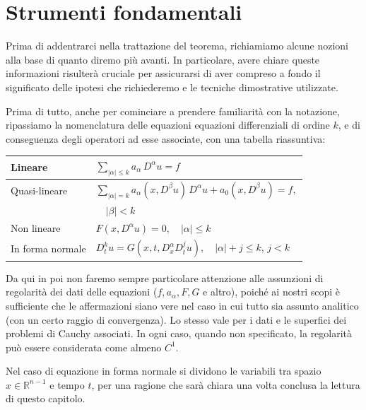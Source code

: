 \chapter{Strumenti fondamentali} \label{tools}
Prima di addentrarci nella trattazione del teorema, richiamiamo alcune nozioni alla base di quanto diremo più avanti. 
In particolare, avere chiare queste informazioni risulterà cruciale per assicurarsi di aver compreso a fondo il significato delle ipotesi che richiederemo e le tecniche dimostrative utilizzate.

Prima di tutto, anche per cominciare a prendere familiarità con la notazione, ripassiamo la nomenclatura delle equazioni equazioni differenziali di ordine $k$, e di conseguenza degli operatori ad esse associate, con una tabella riassuntiva:
\vspace{5mm}
\begin{center}
\renewcommand{\arraystretch}{2}
\begin{tabular}{l l} 
\hline \hline
 Lineare & $\sum_{|\alpha |\leq k} a_\alpha \, D^\alpha u = f$ \\
 \hline
 \vspace{-2mm}
 Quasi-lineare & $\sum_{|\alpha |= k} a_\alpha (x,D^\beta u) \, D^\alpha u +  a_0(x,D^\beta u)= f,$\\
 & $\quad |\beta |<k $ \\
 \hline
 Non lineare & $F(x,D^\alpha u)=0, \quad |\alpha | \leq k$ \\
 \hline
 In forma normale & $D_{t}^k u = G(x,t, D^\alpha_x D^j_t u), \quad |\alpha |+j \leq k, \, j < k$ \\
 \hline \hline
\end{tabular}
\end{center}
\vspace{5mm}
\begin{remark}
Da qui in poi non faremo sempre particolare attenzione alle assunzioni di regolarità dei dati delle equazioni ($f,a_\alpha,F,G$ e altro), poiché ai nostri scopi è sufficiente che le affermazioni siano vere nel caso in cui tutto sia assunto analitico (con un certo raggio di convergenza). Lo stesso vale per i dati e le superfici dei problemi di Cauchy associati. In ogni caso, quando non specificato, la regolarità può essere considerata come almeno $C^1$.
\end{remark}
\begin{remark}
Nel caso di equazione in forma normale si dividono le variabili tra spazio $x\in \mathbb{R}^{n-1}$ e tempo $t$, per una ragione che sarà chiara una volta conclusa la lettura di questo capitolo.
\end{remark}

